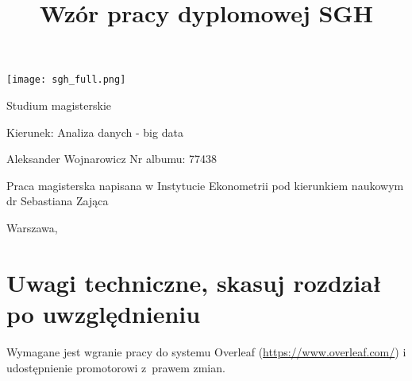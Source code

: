 \documentclass[12pt,a4paper,twoside,openany]{book}
\begin{document}
\begin{center}
\texttt{[image: sgh\_full.png]}

\vspace{1cm}

Studium magisterskie
\end{center}

\vspace{1cm}

\noindent Kierunek: Analiza danych - big data

\vspace{1cm}

{
\leftskip=10cm\noindent
Aleksander Wojnarowicz\newline
Nr albumu: 77438

}

\vspace{2cm}

\title{Wzór pracy dyplomowej SGH}
\makeatletter

\begin{center}
\LARGE\bf
\fbox{\@title}
\end{center}

\vspace{2cm}

{
\leftskip=10cm\noindent
Praca magisterska
napisana w\newline
Instytucie Ekonometrii\newline
pod kierunkiem naukowym\newline
dr Sebastiana Zająca

}

\vfill

\begin{center}
Warszawa, \the\year
\end{center}
\thispagestyle{empty}

\clearpage
\thispagestyle{empty}
\mbox{}
\clearpage

\tableofcontents

\clearpage

\chapter*{Uwagi techniczne, skasuj rozdział po uwzględnieniu}

Wymagane jest wgranie pracy do systemu Overleaf (\url{https://www.overleaf.com/}) i udostępnienie promotorowi z~prawem zmian.
\end{document}
